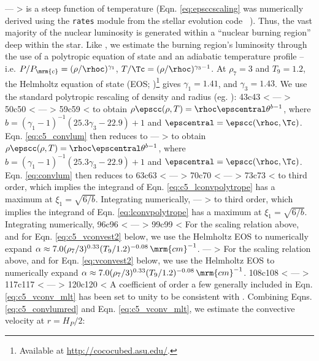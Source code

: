 ---
> \noindent is a steep function of temperature (Eqn. \ref{eq:epsccscaling} was numerically derived using the \texttt{rates} module from the stellar evolution code \mesa\ \citep{paxt+11}).  Thus, the vast majority of the nuclear luminosity is generated within a ``nuclear burning region'' deep within the star.  Like \citeal{wooswk04}, we estimate the burning region's luminosity through the use of a polytropic equation of state and an adiabatic temperature profile -- i.e. $P/P_\mrm{c} = (\rho/\rhoc)^{\gamma_1}$, $T/\Tc = (\rho/\rhoc)^{\gamma_3-1}$.  At $\rho_7 = 3$ and $T_9 = 1.2$, the Helmholtz equation of state (EOS; \citealt{timms00})\footnote{Available at \url{http://cococubed.asu.edu/}.} gives $\gamma_1 = 1.41$, and $\gamma_3 = 1.43$.  We use the standard polytropic rescaling of density and radius (eg. \citealt{kippww12}): 
43c43
< \label{eq:c5_poly_def}
---
> \label{eq:poly_def}
50c50
< \label{eq:c5_poly_alpha}
---
> \label{eq:poly_alpha}
59c59
< \noindent to obtain $\rho\epscc(\rho, T) = \rhoc\epscentral\theta^{b - 1}$, where $b = (\gamma_1 - 1)^{-1}(25.3\gamma_3 - 22.9) + 1$ and $\epscentral = \epscc(\rhoc, \Tc)$.  Eqn. \ref{eq:c5_convlum} then reduces to
---
> \noindent to obtain $\rho\epscc(\rho, T) = \rhoc\epscentral\theta^{b - 1}$, where $b = (\gamma_1 - 1)^{-1}(25.3\gamma_3 - 22.9) + 1$ and $\epscentral = \epscc(\rhoc, \Tc)$.  Eqn. \ref{eq:convlum} then reduces to
63c63
< \label{eq:c5_lconvpolytrope}
---
> \label{eq:lconvpolytrope}
70c70
< \label{eq:c5_theta_approx}
---
> \label{eq:theta_approx}
73c73
< \noindent to third order, which implies the integrand of Eqn. \ref{eq:c5_lconvpolytrope} has a maximum at $\xi_1 = \sqrt{6/b}$.  Integrating numerically,
---
> \noindent to third order, which implies the integrand of Eqn. \ref{eq:lconvpolytrope} has a maximum at $\xi_1 = \sqrt{6/b}$.  Integrating numerically,
96c96
< \label{eq:c5_convlumred}
---
> \label{eq:convlumred}
99c99
< \noindent For the scaling relation above, and for Eqn. \ref{eq:c5_vconvest2} below, we use the Helmholtz EOS to numerically expand $\alpha \approx 7.0(\rho_7/3)^{0.33}(T_9/1.2)^{-0.08}\,\mrm{cm}^{-1}$.
---
> \noindent For the scaling relation above, and for Eqn. \ref{eq:vconvest2} below, we use the Helmholtz EOS to numerically expand $\alpha \approx 7.0(\rho_7/3)^{0.33}(T_9/1.2)^{-0.08}\,\mrm{cm}^{-1}$.
108c108
< \label{eq:c5_vconv_mlt}
---
> \label{eq:vconv_mlt}
117c117
< \label{eq:c5_scaleheight}
---
> \label{eq:scaleheight}
120c120
< \noindent A coefficient of order a few generally included in Eqn. \ref{eq:c5_vconv_mlt} has been set to unity to be consistent with \citeal{piroc08}.  Combining Eqns. \ref{eq:c5_convlumred} and Eqn. \ref{eq:c5_vconv_mlt}, we estimate the convective velocity at $r = H_P/2$:
